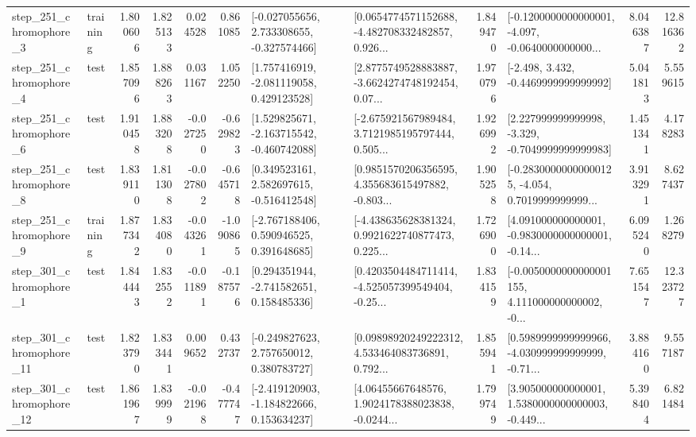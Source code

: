 \begin{tabular}{llrrrrllrlrr}
   step\_251\_chromophore\_3 &  training &      1.800606 &    1.825133 &      0.024528 &  0.861085 &   [-0.027055656, 2.733308655, -0.327574466] &  [0.0654774571152688, -4.482708332482857, 0.926... &       1.849470 &  [-0.1200000000000001, -4.097, -0.0640000000000... &            8.046387 &         12.816362 \\
   step\_251\_chromophore\_4 &      test &      1.857096 &    1.888263 &      0.031167 &  1.052250 &    [1.757416919, -2.081119058, 0.429123528] &  [2.8775749528883887, -3.6624274748192454, 0.07... &       1.970796 &               [-2.498, 3.432, -0.4469999999999992] &            5.041813 &          5.559615 \\
   step\_251\_chromophore\_6 &      test &      1.910458 &    1.883208 &     -0.027250 & -0.629823 &   [1.529825671, -2.163715542, -0.460742088] &  [-2.675921567989484, 3.7121985195797444, 0.505... &       1.926992 &   [2.227999999999998, -3.329, -0.7049999999999983] &            1.451341 &          4.178283 \\
   step\_251\_chromophore\_8 &      test &      1.839110 &    1.811308 &     -0.027802 & -0.645718 &    [0.349523161, 2.582697615, -0.516412548] &  [0.9851570206356595, 4.355683615497882, -0.803... &       1.905258 &  [-0.28300000000000125, -4.054, 0.7019999999999... &            3.913291 &          8.627437 \\
   step\_251\_chromophore\_9 &  training &      1.877342 &    1.834080 &     -0.043261 & -1.090865 &    [-2.767188406, 0.590946525, 0.391648685] &  [-4.438635628381324, 0.9921622740877473, 0.225... &       1.726900 &  [4.091000000000001, -0.9830000000000001, -0.14... &            6.095240 &          1.268279 \\
   step\_301\_chromophore\_1 &      test &      1.844443 &    1.832552 &     -0.011891 & -0.187576 &    [0.294351944, -2.741582651, 0.158485336] &  [0.4203504484711414, -4.525057399549404, -0.25... &       1.834159 &  [-0.0050000000000001155, 4.111000000000002, -0... &            7.651547 &         12.323727 \\
  step\_301\_chromophore\_11 &      test &      1.823790 &    1.833441 &      0.009652 &  0.432737 &    [-0.249827623, 2.757650012, 0.380783727] &  [0.09898920249222312, 4.533464083736891, 0.792... &       1.855941 &  [0.5989999999999966, -4.030999999999999, -0.71... &            3.884160 &          9.557187 \\
  step\_301\_chromophore\_12 &      test &      1.861967 &    1.839999 &     -0.021968 & -0.477747 &   [-2.419120903, -1.184822666, 0.153634237] &  [4.06455667648576, 1.9024178388023838, -0.0244... &       1.799749 &  [3.905000000000001, 1.5380000000000003, -0.449... &            5.398404 &          6.821484 \\

\end{tabular}
